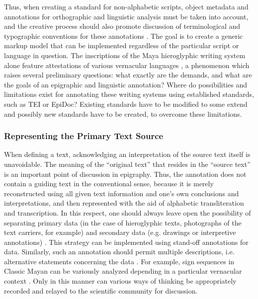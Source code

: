 \documentclass[amsthm,ebook]{saparticle}
\begin{document}
Thus, when creating a standard for non-alphabetic scripts, object metadata and annotations for orthographic and
linguistic analysis must be taken into account, and the creative process should also promote discussion of
terminological and typographic conventions for these annotations \citep{SachseDurr2015}. The goal is to create a generic
markup model that can be implemented regardless of the particular script or language in question. The inscriptions of
the Maya hieroglyphic writing system alone feature attestations of various vernacular languages \citep{LacadenaWichmann2002}, a phenomenon which raises several preliminary questions: what exactly are the demands, and what are the goals of
an epigraphic and linguistic annotation? Where do possibilities and limitations exist for annotating these writing
systems using established standards, such as TEI or EpiDoc? Existing standards have to be modified to some extend and
possibly new standards have to be created, to overcome these limitations. 




\subsubsection[Representing the Primary Text Source]{Representing the Primary Text Source}
When defining a text, acknowledging an interpretation of the source text itself is unavoidable. The meaning of the
``original text'' that resides in the ``source text'' is an important point of discussion in epigraphy. Thus, the
annotation does not contain a guiding text in the conventional sense, because it is merely reconstructed using all
given text information and one’s own conclusions and interpretations, and then represented with the aid of alphabetic
transliteration and transcription. In this respect, one should always leave open the possibility of separating primary
data (in the case of hieroglyphic texts, photographs of the text carriers, for example) and secondary data (e.g.
drawings or interpretive annotations) \citep{Stuhrenberg2012}. This strategy can be implemented using stand-off annotations
for data. Similarly, such an annotation should permit multiple descriptions, i.e. alternative statements concerning the
data \citep{Stuhrenberg2012}. For example, sign sequences in Classic Mayan can be variously analyzed depending in a
particular vernacular context \citep{Gronemeyer2014}. Only in this manner can various ways of thinking be appropriately
recorded and relayed to the scientific community for discussion. 
\end{document}
